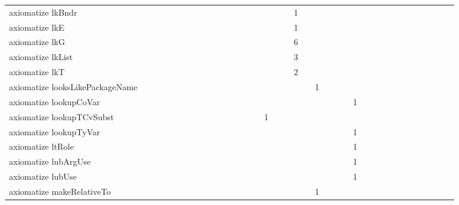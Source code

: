 {\begin{tabular}{l|rrr|rrr|rrr}
axiomatize lkBndr &  &  &  &  &  &  &  &  &  &  &  &  &  &  &  &  &  & 1 &  &  &  &  &  &  &  &  &  &  &  &  &  &  &  &  &  & \\
axiomatize lkE &  &  &  &  &  &  &  &  &  &  &  &  &  &  &  &  &  & 1 &  &  &  &  &  &  &  &  &  &  &  &  &  &  &  &  &  & \\
axiomatize lkG &  &  &  &  &  &  &  &  &  &  &  &  &  &  &  &  &  & 6 &  &  &  &  &  &  &  &  &  &  &  &  &  &  &  &  &  & \\
axiomatize lkList &  &  &  &  &  &  &  &  &  &  &  &  &  &  &  &  &  & 3 &  &  &  &  &  &  &  &  &  &  &  &  &  &  &  &  &  & \\
axiomatize lkT &  &  &  &  &  &  &  &  &  &  &  &  &  &  &  &  &  & 2 &  &  &  &  &  &  &  &  &  &  &  &  &  &  &  &  &  & \\
axiomatize looksLikePackageName &  &  &  &  &  &  &  &  &  &  &  &  &  &  &  &  &  &  &  & 1 &  &  &  &  &  &  &  &  &  &  &  &  &  &  &  & \\
axiomatize lookupCoVar &  &  &  &  &  &  &  &  &  &  &  &  &  &  &  &  &  &  &  &  &  &  &  & 1 &  &  &  &  &  &  &  &  &  &  &  & \\
axiomatize lookupTCvSubst &  &  &  &  &  &  &  &  &  &  &  &  &  &  & 1 &  &  &  &  &  &  &  &  &  &  &  &  &  &  &  &  &  &  &  &  & \\
axiomatize lookupTyVar &  &  &  &  &  &  &  &  &  &  &  &  &  &  &  &  &  &  &  &  &  &  &  & 1 &  &  &  &  &  &  &  &  &  &  &  & \\
axiomatize ltRole &  &  &  &  &  &  &  &  &  &  &  &  &  &  &  &  &  &  &  &  &  &  &  & 1 &  &  &  &  &  &  &  &  &  &  &  & \\
axiomatize lubArgUse &  &  &  &  &  &  &  &  &  &  &  &  &  &  &  &  &  &  &  &  &  &  &  & 1 &  &  &  &  &  &  &  &  &  &  &  & \\
axiomatize lubUse &  &  &  &  &  &  &  &  &  &  &  &  &  &  &  &  &  &  &  &  &  &  &  & 1 &  &  &  &  &  &  &  &  &  &  &  & \\
axiomatize makeRelativeTo &  &  &  &  &  &  &  &  &  &  &  &  &  &  &  &  &  &  &  & 1 &  &  &  &  &  &  &  &  &  &  &  &  &  &  &  & \\

\end{tabular}}
